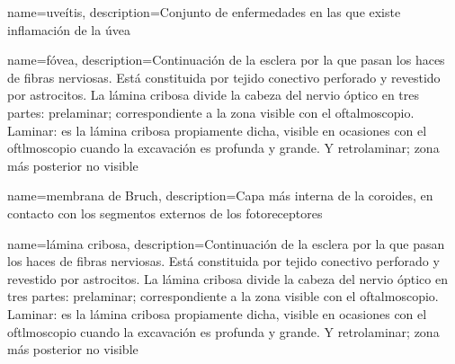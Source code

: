 {
  name={uveítis},
  description={Conjunto de enfermedades en las que existe inflamación de la úvea}
}

{
  name={fóvea},
  description={Continuación de la esclera por la que pasan los haces
    de fibras nerviosas. Está constituida por tejido conectivo
    perforado y revestido por astrocitos. La lámina cribosa divide la
    cabeza del nervio óptico en tres partes: prelaminar;
    correspondiente a la zona visible con el oftalmoscopio. Laminar:
    es la lámina cribosa propiamente dicha, visible en ocasiones con
    el oftlmoscopio cuando la excavación es profunda y grande. Y
    retrolaminar; zona más posterior no visible}
}

{
  name={membrana de Bruch},
  description={Capa más interna de la coroides, en contacto con los
    segmentos externos de los fotoreceptores}
}

{
  name={lámina cribosa},
  description={Continuación de la esclera por la que pasan los haces
    de fibras nerviosas. Está constituida por tejido conectivo
    perforado y revestido por astrocitos. La lámina cribosa divide la
    cabeza del nervio óptico en tres partes: prelaminar;
    correspondiente a la zona visible con el oftalmoscopio. Laminar:
    es la lámina cribosa propiamente dicha, visible en ocasiones con
    el oftlmoscopio cuando la excavación es profunda y grande. Y
    retrolaminar; zona más posterior no visible}
}